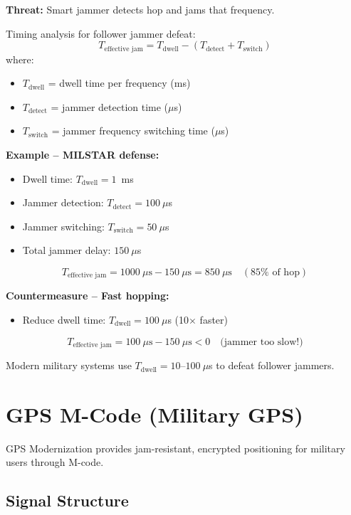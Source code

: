 \textbf{Threat:} Smart jammer detects hop and jams that frequency.

Timing analysis for follower jammer defeat:
\begin{equation}
T_{\text{effective jam}} = T_{\text{dwell}} - (T_{\text{detect}} + T_{\text{switch}})
\end{equation}
where:
\begin{itemize}
\item $T_{\text{dwell}}$ = dwell time per frequency (ms)
\item $T_{\text{detect}}$ = jammer detection time ($\mu$s)
\item $T_{\text{switch}}$ = jammer frequency switching time ($\mu$s)
\end{itemize}

\textbf{Example -- MILSTAR defense:}
\begin{itemize}
\item Dwell time: $T_{\text{dwell}} = 1$~ms
\item Jammer detection: $T_{\text{detect}} = 100~\mu$s
\item Jammer switching: $T_{\text{switch}} = 50~\mu$s
\item Total jammer delay: $150~\mu$s
\end{itemize}
\begin{equation}
T_{\text{effective jam}} = 1000~\mu\text{s} - 150~\mu\text{s} = 850~\mu\text{s} \quad (85\% \text{ of hop})
\end{equation}

\textbf{Countermeasure -- Fast hopping:}
\begin{itemize}
\item Reduce dwell time: $T_{\text{dwell}} = 100~\mu$s (10$\times$ faster)
\end{itemize}
\begin{equation}
T_{\text{effective jam}} = 100~\mu\text{s} - 150~\mu\text{s} < 0 \quad \text{(jammer too slow!)}
\end{equation}

Modern military systems use $T_{\text{dwell}} = 10$--$100~\mu$s to defeat follower jammers.

\section{GPS M-Code (Military GPS)}

GPS Modernization provides jam-resistant, encrypted positioning for military users through M-code.

\subsection{Signal Structure}

